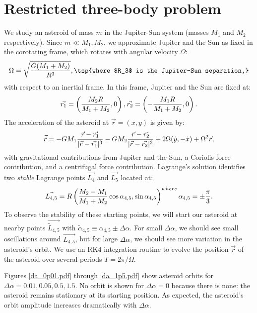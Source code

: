 \documentclass{article}
\begin{document}
\section{Restricted three-body problem}

We study an asteroid of mass $m$ in the Jupiter-Sun system (masses $M_1$ and
$M_2$ respectively). Since $m \ll M_1, M_2$, we approximate Jupiter and the
Sun as fixed in the corotating frame, which rotates with angular velocity
$\Omega$:
\begin{align}
    \Omega = \sqrt{G(M_1 + M_2) \over R^3},
    \tsp{where $R_3$ is the Jupiter-Sun separation,}
\end{align}
with respect to an inertial frame. In this frame, Jupiter and the Sun are
fixed at:
\begin{align}
    \vec{r_1} = \left( {M_2 R \over M_1 + M_2}, 0 \right),
    \sp{}
    \vec{r_2} = \left( -{M_1 R \over M_1 + M_2}, 0 \right).
\end{align}
The acceleration of the asteroid at $\vec r = (x, y)$ is given by:
\begin{align}
    \vec{\ddot r} =
    - {GM_1} {\vec r - \vec{r_1} \over |\vec r - \vec{r_1}|^3}
    - {GM_2} {\vec r - \vec{r_2} \over |\vec r - \vec{r_2}|^3}
    + 2\Omega (\dot y, -\dot x)
    + \Omega^2 \vec r,
\end{align}
with gravitational contributions from Jupiter and the Sun, a Coriolis force
contribution, and a centrifugal force contribution. Lagrange's solution
identifies two \emph{stable} Lagrange points $\vec{L_4}$ and $\vec{L_5}$
located at:
\begin{align}
    \vec{L_{4,5}}
    = R \left({M_2 - M_1 \over M_1 + M_2} \cos\alpha_{4,5},
    \sin\alpha_{4,5}\right)
    \sp{where}
    \alpha_{4,5} = \pm {\pi \over 3}.
\end{align}
To observe the stability of these starting points, we will start our asteroid
at nearby points $\vec{\tilde L_{4,5}}$ with $\tilde \alpha_{4, 5}
\equiv \alpha_{4,5} \pm \Delta\alpha$. For small $\Delta\alpha$, we should
see small oscillations around $\vec{L_{4,5}}$, but for large $\Delta\alpha$,
we should see more variation in the asteroid's orbit. We use an RK4
integration routine to evolve the position $\vec r$ of the asteroid over
several periods $T = 2\pi / \Omega$.

Figures \ref{da_0p01.pdf} through \ref{da_1p5.pdf} show asteroid orbits for
$\Delta\alpha = 0.01, 0.05, 0.5, 1.5$. No orbit is shown for
$\Delta\alpha = 0$ because there is none: the asteroid remains stationary
at its starting position. As expected, the asteroid's orbit amplitude
increases dramatically with $\Delta\alpha$.
\end{document}
